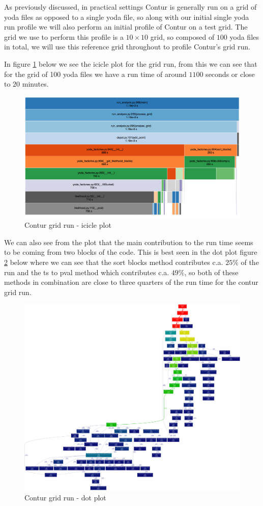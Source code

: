 As previously discussed, in practical settings Contur is generally run on a grid of yoda files as opposed to a single yoda file, so along with our initial single yoda run profile we will also perform an initial profile of Contur on a test grid. The grid we use to perform this profile is a $10 \times 10 $ grid, so composed of $100$ yoda files in total, we will use this reference grid throughout to profile Contur's grid run.

In figure \ref{fig:grid_yoda_start_profile} below we see the icicle plot for the grid run, from this we can see that for the grid of 100 yoda files we have a run time of around $1100$ seconds or close to $20$ minutes. 
\begin{figure}[H]
\centering
\includegraphics[scale=0.30]{plots/initial_contur_grid_profile_two.png}
\caption{Contur grid run - icicle plot}
\label{fig:grid_yoda_start_profile}
\end{figure}

We can also see from the plot that the main contribution to the run time seems to be coming from two blocks of the code. This is best seen in the dot plot figure \ref{fig:grid_yoda_start_profile_dot} below where we can see that the sort blocks method contributes c.a. $25\%$ of the run and the ts to pval method which contributes c.a. $49\%$, so both of these methods in combination are close to three quarters of the run time for the contur grid run.


\begin{figure}[H]
\centering
\includegraphics[scale=0.12]{plots/initial_contur_grid_two.png}
\caption{Contur grid run - dot plot}
\label{fig:grid_yoda_start_profile_dot}
\end{figure}




